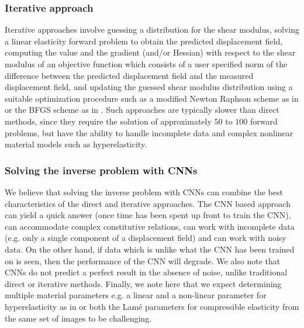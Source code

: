 \documentclass[12pt]{article}
\begin{document}
\subsubsection{Iterative approach} Iterative approaches \cite{paper:oberai2003,paper:gokhale2008,paper:kalle1996,paper:doyley,paper:goenezen2011} involve guessing a distribution for the shear modulus, solving a linear elasticity forward problem to obtain the predicted displacement field, computing the value and the gradient (and/or Hessian) with respect to the shear modulus of an objective function which consists of a user specified norm of the difference between the predicted displacement field and the measured displacement field, and updating the guessed shear modulus distribution using a suitable optimization procedure such as a modified Newton Raphson scheme as in \cite{paper:doyley} or the BFGS scheme as in \cite{paper:gokhale2008,paper:goenezen2011}. Such approaches are typically slower than direct methods, since they require the solution of approximately $50$ to $100$ forward problems, but have the ability to handle incomplete data and complex nonlinear material models such as hyperelasticity.
\subsubsection{Solving the inverse problem with CNNs}
We believe that solving the inverse problem with CNNs can combine the best characteristics of the direct and iterative approaches. The CNN based approach can yield a quick answer (once time has been spent up front to train the CNN), can accommodate complex constitutive relations, can work with incomplete data (e.g. only a single component of a displacement field) and can work with noisy data. On the other hand, if data which is unlike what the CNN has been trained on is seen, then the performance of the CNN will degrade. We also note that CNNs do not predict a perfect result in the absence of noise, unlike traditional direct or iterative methods. Finally, we note here that we expect determining multiple material parameters e.g. a linear and a non-linear parameter for hyperelasticity as in \cite{paper:gokhale2008}or both the Lam\'e parameters for compressible elasticity from the same set of images to be challenging.
\end{document}
